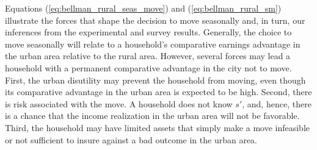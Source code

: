 \documentclass[pdftex,11pt]{article}
\begin{document}
Equations (\ref{eq:bellman_rural_seas_move}) and (\ref{eq:bellman_rural_sm}) illustrate the forces that shape the decision to move seasonally and, in turn, our inferences from the experimental and survey results. Generally, the choice to move seasonally will relate to a household's comparative earnings advantage in the urban area relative to the rural area. However, several forces may lead a household with a permanent comparative advantage in the city not to move. First, the urban disutility may prevent the household from moving, even though its comparative advantage in the urban area is expected to be high. Second, there is risk associated with the move. A household does not know $s'$, and, hence, there is a chance that the income realization in the urban area will not be favorable. Third, the household may have limited assets that simply make a move infeasible or not sufficient to insure against a bad outcome in the urban area.
\end{document}
